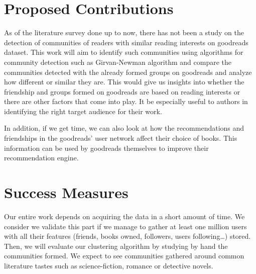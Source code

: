 \documentclass[12pt]{article}
\begin{document}







\section{Proposed Contributions}
As of the literature survey done up to now, there has not been a study on the detection of communities of readers with similar reading interests on goodreads dataset.
This work will aim to identify such communities using algorithms for community detection such as Girvan-Newman algorithm and compare the communities detected with the already formed groups on goodreads and analyze how different or similar they are.
This would give us insights into whether the friendship and groups formed on goodreads are based on reading interests or there are other factors that come into play. It be especially useful to authors in identifying the right target audience for their work.

In addition, if we get time, we can also look at how the recommendations and friendships in the goodreads' user network affect their choice of books. This information can be used by goodreads themselves to improve their recommendation engine.

\section{Success Measures}

Our entire work depends on acquiring the data in a short amount of time. We consider we validate this part if we manage to gather at least one million users with all their features (friends, books owned, followers, users following\dots) stored.\\
Then, we will evaluate our clustering algorithm by studying by hand the communities formed. We expect to see communities gathered around common literature tastes such as science-fiction, romance or detective novels. 
\end{document}
